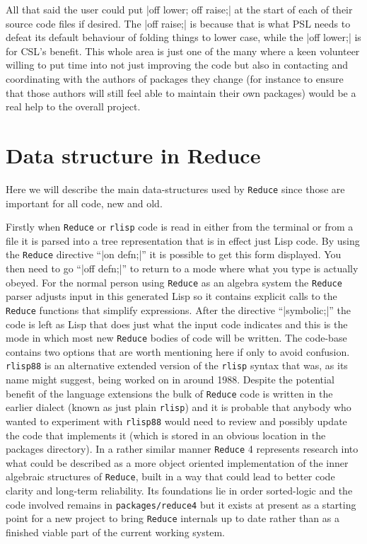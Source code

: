 \documentclass[12pt,twoside,openright]{memoir}
\newcommand{\reduce}{\texttt{Reduce}\xspace}
\begin{document}
All that said the user could put |off lower; off raise;| at the start of
each of their source code files if desired. The |off raise;| is because
that is what PSL needs to defeat its default behaviour of folding things
to lower case, while the |off lower;| is for CSL's benefit. This whole area is
just one of the many where a keen volunteer willing to put time into not just
improving the code but also in contacting and coordinating with the authors of
packages they change (for instance to ensure that those authors will still feel
able to maintain their own packages) would be a real help to the overall
project. 


\section{Data structure in Reduce}

Here we will describe the main data-structures used by \reduce since those are
important for all code, new and old.

Firstly when \reduce or \texttt{rlisp} code is read in either from the terminal
or from a file it is parsed into a tree representation that is in effect
just Lisp code. By using the \reduce directive ``|on defn;|'' it is possible
to get this form displayed. You then need to go ``|off defn;|'' to return to
a mode where what you type is actually obeyed. For the normal person using
\reduce as an algebra system the \reduce parser adjusts input in this
generated Lisp so it contains explicit calls to the \reduce functions that
simplify expressions. After the directive ``|symbolic;|'' the code is
left as Lisp that does just what the input code indicates and this is the
mode in which most new \reduce bodies of code will be written. The
code-base contains two options that are worth mentioning here if only to
avoid confusion. \texttt{rlisp88} is an alternative extended version of the
\texttt{rlisp} syntax that was, as its name might suggest, being worked on
in around 1988. Despite the potential benefit of the language extensions the
bulk of \reduce code is written in the earlier dialect (known as just
plain \texttt{rlisp}) and it is probable that anybody who wanted to
experiment with \texttt{rlisp88} would need to review and possibly update the
code that implements it (which is stored in an obvious location in the
packages directory). In a rather similar manner \reduce 4 represents
research into what could be described as a more object oriented implementation
of the inner algebraic structures of \reduce, built in a way that could
lead to better code clarity and long-term reliability. Its foundations lie in
order sorted-logic and the code involved remains in \texttt{packages/reduce4}
but it exists at present as a starting point for a new project to bring
\reduce internals up to date rather than as a finished viable part of the
current working system.
\end{document}
